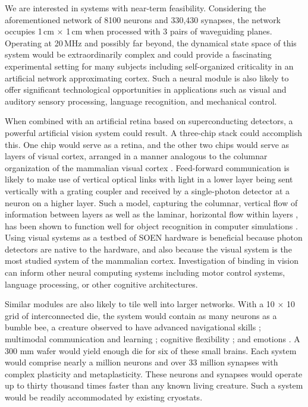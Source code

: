\documentclass[twocolumn]{article}
\begin{document}
We are interested in systems with near-term feasibility. Considering the aforementioned network of 8100 neurons and 330,430 synapses, the network occupies 1\,cm $\times$ 1\,cm when processed with 3 pairs of waveguiding planes. Operating at 20\,MHz and possibly far beyond, the dynamical state space of this system would be extraordinarily complex and could provide a fascinating experimental setting for many subjects including self-organized criticality \cite{be2007,kism2009,shya2009,ch2010,rusp2011} in an artificial network approximating cortex. Such a neural module is also likely to offer significant technological opportunities in applications such as visual and auditory sensory processing, language recognition, and mechanical control.  

When combined with an artificial retina based on superconducting detectors, a powerful artificial vision system could result. A three-chip stack could accomplish this. One chip would serve as a retina, and the other two chips would serve as layers of visual cortex, arranged in a manner analogous to the columnar organization of the mammalian visual cortex \cite{mo1997}. Feed-forward communication is likely to make use of vertical optical links with light in a lower layer being sent vertically with a grating coupler and received by a single-photon detector at a neuron on a higher layer. Such a model, capturing the columnar, vertical flow of information between layers as well as the laminar, horizontal flow within layers \cite{lued1997,spto2000,brto2006}, has been shown to function well for object recognition in computer simulations \cite{haah2017}. Using visual systems as a testbed of SOEN hardware is beneficial because photon detectors are native to the hardware, and also because the visual system is the most studied system of the mammalian cortex. Investigation of binding in vision \cite{ro1999,tr1999,woca1999,vala2001,enfr2001,haah2017} can inform other neural computing systems including motor control systems, language processing, or other cognitive architectures.

Similar modules are also likely to tile well into larger networks. With a 10 $\times$ 10 grid of interconnected die, the system would contain as many neurons as a bumble bee, a creature observed to have advanced navigational skills \cite{chmi2014}; multimodal communication and learning \cite{alpe2016}; cognitive flexibility \cite{lope2017}; and emotions \cite{peba2016}. A 300 mm wafer would yield enough die for six of these small brains. Each system would comprise nearly a million neurons and over 33 million synapses with complex plasticity and metaplasticity. These neurons and synapses would operate up to thirty thousand times faster than any known living creature. Such a system would be readily accommodated by existing cryostats.  
\end{document}
